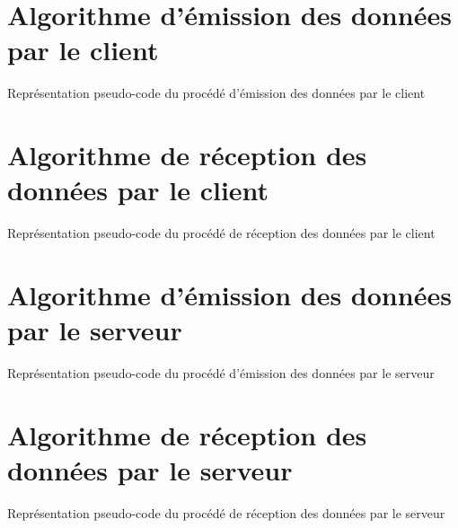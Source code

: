 \color{ForestGreen}
\section{Algorithme d'émission des données par le client}

\begin{algorithm}[H]
	\KwResult{ - }
\caption{Représentation pseudo-code du procédé d'émission des données par le client}
\end{algorithm}

\section{Algorithme de réception des données par le client}

\begin{algorithm}[H]
	\KwResult{ - }
\caption{Représentation pseudo-code du procédé de réception des données par le client}
\end{algorithm}

\section{Algorithme d'émission des données par le serveur}

\begin{algorithm}[H]
	\KwResult{ - }
\caption{Représentation pseudo-code du procédé d'émission des données par le serveur}
\end{algorithm}

\section{Algorithme de réception des données par le serveur}

\begin{algorithm}[H]
	\KwResult{ - }
\caption{Représentation pseudo-code du procédé de réception des données par le serveur}
\end{algorithm}
\color{black}
